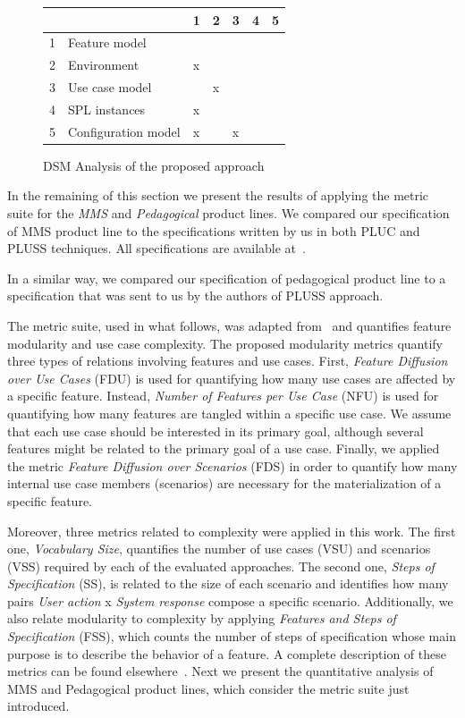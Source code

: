 \documentclass{acm_proc_article-sp}
\begin{document}
\begin{figure}[h]
\centering
\begin{small}
\begin{tabular}{lllllll} \hline
& & 1 & 2 & 3 & 4 & 5 \\ \hline
1 & Feature model 		& 	& 	&      &  	&  	\\ 
2 & Environment & x	&	&	&	&  	\\
3 & Use case model 	&  	&  x	&  	&  	& 	\\
4 & SPL instances 		& x 	& 	& 	&   	& 	\\
5 & Configuration model 	& x 	&  	&  x	&  	& 	\\  \hline
\end{tabular}
\end{small}
\caption{DSM Analysis of the proposed approach}
\label{dsm:cc}
\end{figure}   

 
In the remaining of this section we present the results of applying the metric suite for 
the \emph{MMS} and \emph{Pedagogical} product lines. We compared our specification of MMS product line to the specifications written by us in both PLUC and PLUSS techniques. All specifications are available at~\cite{spg-url}.  

In a similar way, we compared our specification of pedagogical product line to a specification 
that was sent to us by the authors of PLUSS approach. 

The metric suite, used in what follows, was adapted from~\cite{garcia-taosd-2005} and quantifies 
feature modularity and use case complexity. The proposed modularity 
metrics quantify three types of relations involving features and use cases.
First, \emph{Feature Diffusion over Use Cases} (FDU) is used for
quantifying how many use cases are affected by a specific
feature. Instead, \emph{Number of Features per Use Case} (NFU) is used for quantifying
how many features are tangled within a specific use
case. We assume that each use case should be interested in
its primary goal, although several features might be related
to the primary goal of a use case. Finally, we applied
the metric \emph{Feature Diffusion over Scenarios} (FDS) in order
to quantify how many internal use case members (scenarios)
are necessary for the materialization of a specific feature.
 
Moreover, three metrics related to complexity were applied in this work.
The first one, \emph{Vocabulary Size}, quantifies the number of use
cases (VSU) and scenarios (VSS) required by each of the evaluated
approaches. The second one, \emph{Steps of Specification}
(SS), is related to the size of each scenario and identifies
how many pairs \emph{User action} x \emph{System response} compose a
specific scenario. Additionally, we also relate modularity to
complexity by applying \emph{Features and Steps of Specification}
(FSS), which counts the number of steps of specification
whose main purpose is to describe the behavior of a feature. 
A complete description of these metrics can be found elsewhere~\cite{rbonifacio-ea-2008}. Next we 
present the quantitative analysis of MMS and Pedagogical product lines, which consider the metric suite
just introduced.  
\end{document}
